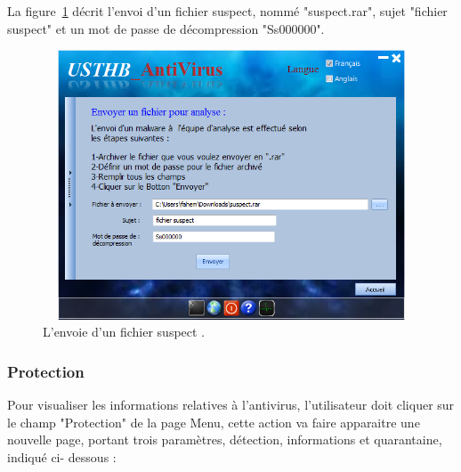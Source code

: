 La figure~\ref{fig :ant4} décrit l'envoi d'un fichier suspect, nommé "suspect.rar",  sujet "fichier suspect" et un mot de passe de décompression "Ss000000".
\begin{figure}[H]
\begin{center}
\includegraphics[width=13cm, height=8cm]{Figures/ant4.png}
\caption{L'envoie d'un fichier suspect .}
\label{fig :ant4} 
\end{center}
\end{figure}

\subsubsection{Protection} 
Pour visualiser les informations relatives à l'antivirus, l'utilisateur doit cliquer sur le champ "Protection" de la page Menu, cette action va faire apparaitre une nouvelle page,  portant trois paramètres, détection, informations et quarantaine, indiqué ci- dessous :\\

